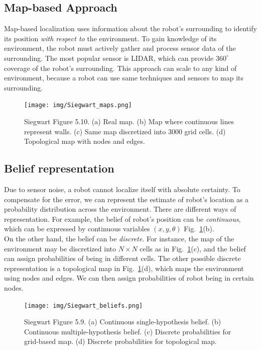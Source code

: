 \documentclass[twoside]{article}
\begin{document}
\subsection{Map-based Approach}

Map-based localization uses information about the robot's surrounding to identify its position \textit{with respect to} the environment. To gain knowledge of its environment, the robot must actively gather and process sensor data of the surrounding. The most popular sensor is LIDAR, which can provide $360^\circ$ coverage of the robot's surrounding. This approach can scale to any kind of environment, because a robot can use same techniques and sensors to map its surrounding.

\begin{figure}[h!]
	\centering
    \texttt{[image: img/Siegwart\_maps.png]}
    \caption{Siegwart Figure 5.10. (a) Real map. (b) Map where continuous lines represent walls. (c) Same map discretized into 3000 grid cells. (d) Topological map with nodes and edges.}
    \label{fig:siegwart_maps}
\end{figure}

\subsection{Belief representation}
Due to sensor noise, a robot cannot localize itself with absolute certainty. To compensate for the error, we can represent the estimate of robot's location as a probability distribution across the environment. There are different ways of representation. For example, the belief of robot's position can be \emph{continuous}, which can be expressed by continuous variables $(x, y, \theta)$ Fig.~\ref{fig:siegwart_maps}(b). \\

On the other hand, the belief can be \emph{discrete}. For instance, the map of the environment may be discretized into $N \times N$ cells as in Fig.~\ref{fig:siegwart_maps}(c), and the belief can assign probabilities of being in different cells. The other possible discrete representation is a topological map in Fig.~\ref{fig:siegwart_maps}(d), which maps the environment using nodes and edges. We can then assign probabilities of robot being in certain nodes. \\

\begin{figure}[h!]
	\centering
    \texttt{[image: img/Siegwart\_beliefs.png]}
    \caption{Siegwart Figure 5.9. (a) Continuous single-hypothesis belief. (b) Continuous multiple-hypothesis belief. (c) Discrete probabilities for grid-based map. (d) Discrete probabilities for topological map.}
    \label{fig:siegwart_beliefs}
\end{figure}
\end{document}
